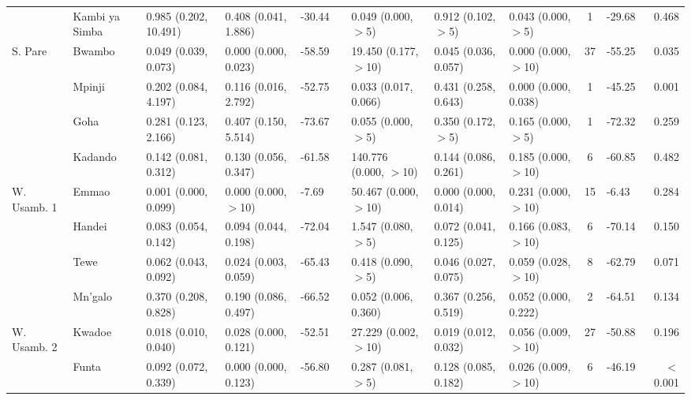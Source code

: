 \begin{tabular}{lllllllllclr}
            & Kambi ya Simba & 0.985 (0.202, 10.491)  & 0.408 (0.041, 1.886)   & -30.44   & &  0.049   (0.000, $>$5)    & 0.912 (0.102, $>$5)    & 0.043 (0.000, $>$5)    & 1    & -29.68   & 0.468\\
\cmidrule{2-12}
S. Pare     & Bwambo         & 0.049 (0.039, 0.073)   & 0.000 (0.000, 0.023)   & -58.59   & &  19.450  (0.177, $>$10)   & 0.045 (0.036, 0.057)   & 0.000 (0.000, $>$10)   & 37   & -55.25   & 0.035\\
            & Mpinji         & 0.202 (0.084, 4.197)   & 0.116 (0.016, 2.792)   & -52.75   & &  0.033   (0.017, 0.066)   & 0.431 (0.258, 0.643)   & 0.000 (0.000, 0.038)   & 1    & -45.25   & 0.001\\
            & Goha           & 0.281 (0.123, 2.166)   & 0.407 (0.150, 5.514)   & -73.67   & &  0.055   (0.000, $>$5)    & 0.350 (0.172, $>$5)    & 0.165 (0.000, $>$5)    & 1    & -72.32   & 0.259\\
            & Kadando        & 0.142 (0.081, 0.312)   & 0.130 (0.056, 0.347)   & -61.58   & &  140.776 (0.000, $>$10)   & 0.144 (0.086, 0.261)   & 0.185 (0.000, $>$10)   & 6    & -60.85   & 0.482\\
\cmidrule{2-12}
W. Usamb. 1 & Emmao          & 0.001 (0.000, 0.099)   & 0.000 (0.000, $>$10)   & -7.69    & &  50.467  (0.000, $>$10)   & 0.000 (0.000, 0.014)   & 0.231 (0.000, $>$10)   & 15   & -6.43    & 0.284\\
            & Handei         & 0.083 (0.054, 0.142)   & 0.094 (0.044, 0.198)   & -72.04   & &  1.547   (0.080, $>$5)    & 0.072 (0.041, 0.125)   & 0.166 (0.083, $>$10)   & 6    & -70.14   & 0.150\\
            & Tewe           & 0.062 (0.043, 0.092)   & 0.024 (0.003, 0.059)   & -65.43   & &  0.418   (0.090, $>$5)    & 0.046 (0.027, 0.075)   & 0.059 (0.028, $>$10)   & 8    & -62.79   & 0.071\\
            & Mn'galo        & 0.370 (0.208, 0.828)   & 0.190 (0.086, 0.497)   & -66.52   & &  0.052   (0.006, 0.360)   & 0.367 (0.256, 0.519)   & 0.052 (0.000, 0.222)   & 2    & -64.51   & 0.134\\
\cmidrule{2-12}
W. Usamb. 2 & Kwadoe         & 0.018 (0.010, 0.040)   & 0.028 (0.000, 0.121)   & -52.51   & &  27.229  (0.002, $>$10)   & 0.019 (0.012, 0.032)   & 0.056 (0.009, $>$10)   & 27   & -50.88   & 0.196\\
            & Funta          & 0.092 (0.072, 0.339)   & 0.000 (0.000, 0.123)   & -56.80   & &  0.287   (0.081, $>$5)    & 0.128 (0.085, 0.182)   & 0.026 (0.009, $>$10)   & 6    & -46.19   & $<$0.001\\

\end{tabular}
